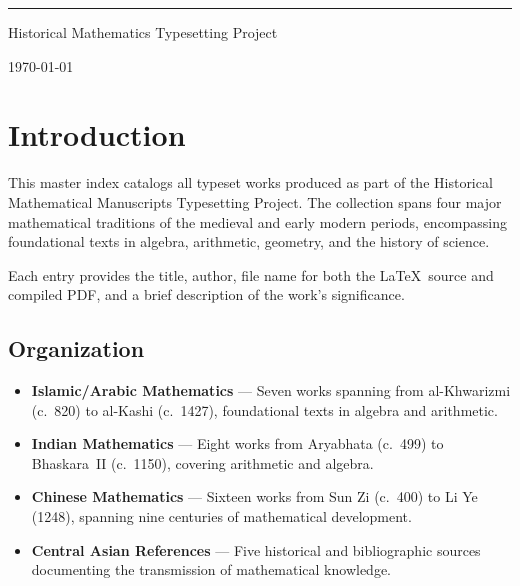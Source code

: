 \documentclass[11pt,a4paper]{article}
\begin{document}
\begin{titlepage}
\begin{center}
    \vfill
    
    {\color{goldaccent}\rule{\textwidth}{1.5pt}}
    
    \vspace{0.8cm}
    
    {\large\color{sectioncolor} Historical Mathematics Typesetting Project}
    
    \vspace{0.3cm}
    
    {\color{sectioncolor}\today}
    
    
  \end{center}
\end{titlepage}

\newpage
\thispagestyle{empty}
\tableofcontents
\newpage

\section*{Introduction}

This master index catalogs all typeset works produced as part of the Historical Mathematical Manuscripts Typesetting Project. The collection spans four major mathematical traditions of the medieval and early modern periods, encompassing foundational texts in algebra, arithmetic, geometry, and the history of science.

Each entry provides the title, author, file name for both the \LaTeX\ source and compiled PDF, and a brief description of the work's significance.

\subsection*{Organization}
\begin{itemize}
  \item \textbf{Islamic/Arabic Mathematics} --- Seven works spanning from al-Khwarizmi (c.~820) to al-Kashi (c.~1427), foundational texts in algebra and arithmetic.
  \item \textbf{Indian Mathematics} --- Eight works from Aryabhata (c.~499) to Bhaskara~II (c.~1150), covering arithmetic and algebra.
  \item \textbf{Chinese Mathematics} --- Sixteen works from Sun Zi (c.~400) to Li Ye (1248), spanning nine centuries of mathematical development.
  \item \textbf{Central Asian References} --- Five historical and bibliographic sources documenting the transmission of mathematical knowledge.
\end{itemize}
\end{document}
